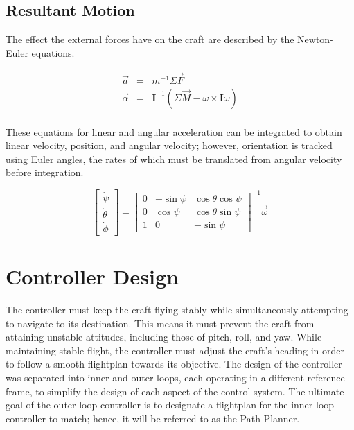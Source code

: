 \documentclass{sydeStyle}
\begin{document}
\subsection{Resultant Motion}

The effect the external forces have on the craft are described by the
Newton-Euler equations.

\begin{eqnarray*}
\vec{a} &=& m^{-1} \Sigma \vec{F} \\
\vec{\alpha} &=& \textbf{I}^{-1}(\Sigma \vec{M} - \omega \times \textbf{I} \omega) \\
\end{eqnarray*}

These equations for linear and angular acceleration can be integrated to obtain
linear velocity, position, and angular velocity; however, orientation is tracked
using Euler angles, the rates of which must be translated from angular velocity
before integration.

\begin{displaymath}
\left[ \begin{matrix}
\dot{\psi} \\
\dot{\theta} \\
\dot{\phi}
\end{matrix} \right] = \left[ \begin{matrix}
0 & -\sin \psi &  \cos \theta \cos \psi \\
0 &  \cos \psi &  \cos \theta \sin \psi \\
1 & 0          & -\sin \psi
\end{matrix} \right] ^{-1} \vec{\omega}
\end{displaymath}

\section{Controller Design}
The controller must keep the craft flying stably while simultaneously attempting
to navigate to its destination.  This means it must prevent the craft from
attaining unstable attitudes, including those of pitch, roll, and yaw.  While
maintaining stable flight, the controller must adjust the craft's heading in
order to follow a smooth flightplan towards its objective.  The design of the
controller was separated into inner and outer loops, each operating in a
different reference frame, to simplify the design of each aspect of the control
system.  The ultimate goal of the outer-loop controller is to designate a
flightplan for the inner-loop controller to match; hence, it will be referred to
as the Path Planner.
\end{document}
